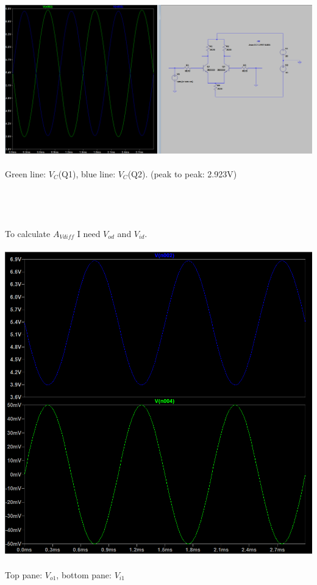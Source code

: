 \documentclass{article}
\begin{document}
\begin{enumerate}
		\includegraphics[scale=0.4]{prelab 4/circuit 2 - coll voltages}\\\\
		Green line: \(V_C\)(Q1), blue line: \(V_C\)(Q2). (peak to peak: 2.923V)\\\\\\\\\\
		To calculate \(A_{Vdiff}\) I need \(V_{od}\) and \(V_{id}\).\\\\
		\includegraphics[scale=0.6]{prelab 4/circuit 2 - adiff}\\\\
		Top pane: \(V_{o1}\), bottom pane: \(V_{i1}\)\\

\end{enumerate}
\end{document}
